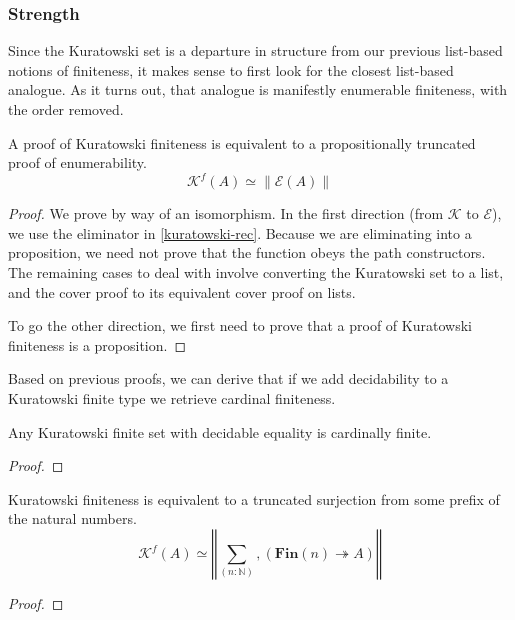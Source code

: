 \subsubsection{Strength}
Since the Kuratowski set is a departure in structure from our previous
list-based notions of finiteness, it makes sense to first look for the closest
list-based analogue.
As it turns out, that analogue is manifestly enumerable finiteness, with the
order removed.
\begin{theorem}
  A proof of Kuratowski finiteness is equivalent to a propositionally truncated
  proof of enumerability.
  \begin{equation}
    \mathcal{K}^f(A) \simeq \lVert \mathcal{E}(A) \rVert
  \end{equation}
\end{theorem}
\begin{proof}
  We prove by way of an isomorphism.
  In the first direction (from \(\mathcal{K}\) to \(\mathcal{E}\)), we use the
  eliminator in \ref{kuratowski-rec}.
  Because we are eliminating into a proposition, we need not prove that the
  function obeys the path constructors.
  The remaining cases to deal with involve converting the Kuratowski set to a
  list, and the cover proof to its equivalent cover proof on lists.

  To go the other direction, we first need to prove that a proof of Kuratowski
  finiteness is a proposition.
\end{proof}
Based on previous proofs, we can derive that if we add decidability to a
Kuratowski finite type we retrieve cardinal finiteness.
\begin{lemma}
  Any Kuratowski finite set with decidable equality is cardinally finite.
\end{lemma}
\begin{proof}
\end{proof}
\begin{lemma}
  Kuratowski finiteness is equivalent to a truncated surjection from some prefix
  of the natural numbers.
  \begin{equation}
    \mathcal{K}^f(A) \simeq \left\Vert \sum_{(n : \mathbb{N})} , \left(  \mathbf{Fin}(n) \twoheadrightarrow A \right) \right\Vert
  \end{equation}
\end{lemma}
\begin{proof}
\end{proof}
